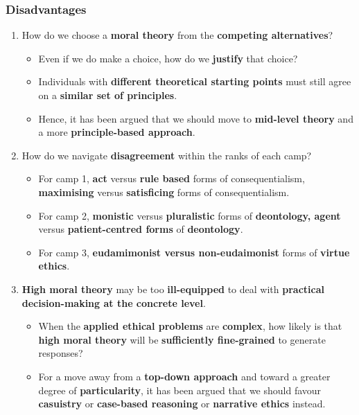 \documentclass[11pt]{article}
\begin{document}
\subsubsection{Disadvantages}
\label{sec:orga64dc56}
\begin{enumerate}
\item How do we choose a \textbf{moral theory} from the \textbf{competing alternatives}?
\begin{itemize}
\item Even if we do make a choice, how do we \textbf{justify} that choice?
\item Individuals with \textbf{different theoretical starting points} must still agree on a \textbf{similar set of principles}.
\item Hence, it has been argued that we should move to \textbf{mid-level theory} and a more \textbf{principle-based approach}.
\end{itemize}
\item How do we navigate \textbf{disagreement} within the ranks of each camp?
\begin{itemize}
\item For camp 1, \textbf{act} versus \textbf{rule based} forms of consequentialism, \textbf{maximising} versus \textbf{satisficing} forms of consequentialism.
\item For camp 2, \textbf{monistic} versus \textbf{pluralistic} forms of \textbf{deontology, agent} versus \textbf{patient-centred forms} of \textbf{deontology}.
\item For camp 3, \textbf{eudamimonist versus non-eudaimonist} forms of \textbf{virtue ethics}.
\end{itemize}
\item \textbf{High moral theory} may be too \textbf{ill-equipped} to deal with \textbf{practical decision-making at the concrete level}.
\begin{itemize}
\item When the \textbf{applied ethical problems} are \textbf{complex}, how likely is that \textbf{high moral theory} will be \textbf{sufficiently fine-grained} to generate responses?
\item For a move away from a \textbf{top-down approach} and toward a greater degree of \textbf{particularity}, it has been argued that we should favour \textbf{casuistry} or \textbf{case-based reasoning} or \textbf{narrative ethics} instead.
\end{itemize}
\end{enumerate}
\end{document}
